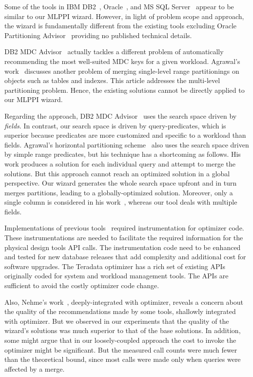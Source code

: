 \documentclass[runningheads]{comsis2}
\begin{document}
Some of the tools in IBM DB2~\cite{Lightstone04:db2auto}, 
Oracle~\cite{sheet2009oracle}, and MS SQL Server~\cite{agrawal04:integrating} 
appear to be similar to our MLPPI wizard. 
However, in light of problem scope and approach, the wizard 
is fundamentally different from the existing tools excluding Oracle Partitioning \hbox{Advisor}~\cite{sheet2009oracle} 
providing no published technical details. 

DB2 MDC Advisor~\cite{Lightstone04:db2auto} actually tackles 
a different problem of automatically recommending the most well-suited MDC 
keys for a given workload. 
Agrawal's work~\cite{agrawal04:integrating} 
discusses another problem of merging \hbox{single-level} range partitionings on objects such as tables and indexes. 
This article addresses the multi-level \hbox{partitioning} problem. 
Hence, the existing solutions cannot be directly applied to our MLPPI wizard.   

Regarding the approach, DB2 MDC Advisor~\cite{Lightstone04:db2auto} uses 
the search space driven by {\em fields}. In contrast, our search 
space is driven by query-predicates, which is superior because 
\hbox{predicates} are more customized and specific to a workload than fields. 
Agrawal's horizontal partitioning scheme~\cite{agrawal04:integrating} 
also uses the search space driven by simple range predicates, but 
his technique has a \hbox{shortcoming} as follows. 
His work produces a solution for each individual query and attempt 
to merge the solutions. But this approach cannot reach 
an optimized solution in a global \hbox{perspective}.
Our wizard generates the whole search space upfront and in turn merges partitions, leading to a globally-optimized \hbox{solution}. 
Moreover, only a single column is considered in his work~\cite{agrawal04:integrating}, 
whereas our tool deals with multiple fields. 

Implementations of previous tools~\cite{agrawal04:integrating,Lightstone04:db2auto,nehme2011automated} \hbox{required} instrumentation for optimizer code.
These instrumentations are needed to facilitate the required 
information for the physical design tools API calls. 
The \hbox{instrumentation} code need to be enhanced and tested for new database 
releases that add complexity and additional cost for software upgrades. 
The Teradata optimizer has a rich set of existing APIs originally coded 
for system and workload management tools. 
The APIs are sufficient to avoid the costly optimizer code change. 

Also, Nehme's work~\cite{nehme2011automated}, deeply-integrated with 
optimizer, reveals a concern about the quality of the recommendations 
made by some tools, shallowly integrated with optimizer. 
But we observed in our experiments that the quality of 
the wizard's solutions was much superior to that of the base solutions. 
In addition, some might argue that in our loosely-coupled approach 
the cost to invoke the optimizer might be significant. 
But the measured call counts were much fewer than 
the theoretical bound, since most calls were made only when queries were affected by a merge.  
\end{document}

